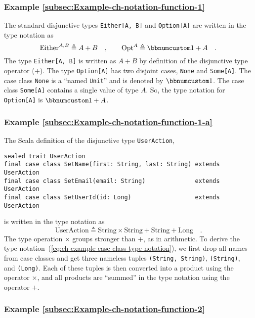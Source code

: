 \subsubsection{Example \label{subsec:Example-ch-notation-function-1}\ref{subsec:Example-ch-notation-function-1}}

The standard disjunctive types \lstinline!Either[A, B]! and \lstinline!Option[A]!
are written in the type notation as
\[
\text{Either}^{A,B}\triangleq A+B\quad,\quad\quad\text{Opt}^{A}\triangleq\bbnum 1+A\quad.
\]
The type \lstinline!Either[A, B]! is written as $A+B$ by definition
of the disjunctive type operator ($+$). The type \lstinline!Option[A]!
has two disjoint cases, \lstinline!None! and \lstinline!Some[A]!.
The case class \lstinline!None! is a ``named
\lstinline!Unit!'' and is denoted by $\bbnum 1$. The case class
\lstinline!Some[A]! contains a single value of type $A$. So, the
type notation for \lstinline!Option[A]! is $\bbnum 1+A$.

\subsubsection{Example \label{subsec:Example-ch-notation-function-1-a}\ref{subsec:Example-ch-notation-function-1-a}}

The Scala definition of the disjunctive type \lstinline!UserAction!,
\begin{lstlisting}
sealed trait UserAction
final case class SetName(first: String, last: String) extends UserAction
final case class SetEmail(email: String)              extends UserAction
final case class SetUserId(id: Long)                  extends UserAction
\end{lstlisting}
is written in the type notation as
\begin{equation}
\text{UserAction}\triangleq\text{String}\times\text{String}+\text{String}+\text{Long}\quad.\label{eq:ch-example-case-class-type-notation}
\end{equation}
The type operation $\times$ groups stronger than $+$, as in arithmetic.
To derive the type notation~(\ref{eq:ch-example-case-class-type-notation}),
we first drop all names from case classes and get three nameless tuples
\lstinline!(String, String)!, \lstinline!(String)!, and \lstinline!(Long)!.
Each of these tuples is then converted into a product using the operator
$\times$, and all products are ``summed'' in the type notation
using the operator $+$.

\subsubsection{Example \label{subsec:Example-ch-notation-function-2}\ref{subsec:Example-ch-notation-function-2}}

